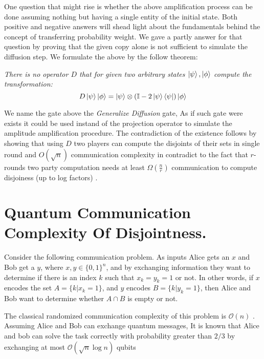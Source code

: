 \documentclass{article}
\newcommand{\commentt}[1]{\textcolor{blue}{ \textbf{[COMMENT]} #1}}
\newcommand{\ctt}[1]{\commentt{#1}}
\newcommand{\onotation}[1]{\(\mathcal{O} \left( {#1}  \right) \)}
\newcommand{\ona}[1]{\onotation{#1}}
\begin{document}
  One question that might rise is whether the above amplification process can be done assuming nothing but having a single entity of the initial state. Both positive and negative answers will shead light about the fundamentals behind the concept of transferring probability weight. We gave a partly answer for that question by proving that the given copy alone is not sufficient to simulate the diffusion step. We formulate the above by the follow theorem: 

  \begin{theorem} \textit{ There is no operator $D$ that for given two arbitrary states $\ket{\psi},\ket{\phi}$ compute the transformation:} 
\begin{equation*}
    D \ket{\psi}\ket{\phi} = \ket{\psi}\otimes\left( \mathbb{I} - 2 \ket{\psi}\bra{\psi} \right)\ket{\phi} 
\end{equation*}
\end{theorem}

We name the gate above the \textit{Generalize Diffusion} gate, As if such gate were exists it could be used instand of the projection operator to simulate the amplitude amplification procedure. The contradiction of the existence follows by showing that using $D$ two players can compute the disjoints of their sets in single round and $O\left( \sqrt{n} \right)$ communication complexity in contradict to the fact that $r$-rounds two party computation needs at least $\Omega\left( \frac{n}{r} \right)$ communication to compute disjoiness (up to log factors) \cite{Braverman}.    

\section{Quantum Communication Complexity Of Disjointness.}
Consider the following communication problem.
As inputs Alice gets an \(x\) and Bob get a \(y\), where \(x, y \in \{0, 1\}^n \), and by exchanging information they want to determine if there is an index \(k\) such that \(x_k = y_k = 1 \) or not. 
In other words, if \(x\) encodes the set \(A = \{k | x_k = 1\} \), and \(y\) encodes \(B = \{k | y_k = 1\}\), 
then Alice and Bob want to determine whether \( A \cap B \) is empty or not.

The classical randomized communication complexity of this problem is \ona{n} \cite{v003a011}.
Assuming Alice and Bob can exchange quantum messages, It is known that Alice and bob can solve the task
correctly with probability greater than \(2/3\) by exchanging at most \ona{\sqrt{n}\log n } qubits %
\end{document}
